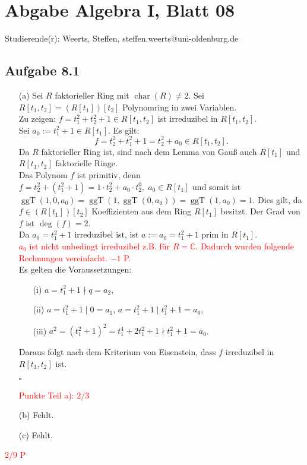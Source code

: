 \documentclass[12pt]{article}
\newcommand{\corr}[1]{\textcolor{red}{#1}}
\newcommand{\QED}{\begin{flushright} $\square$ \end{flushright}}
\newcommand{\Char}{\operatorname{char}}
\newcommand{\ggT}{\operatorname{ggT}}
\newcommand{\grad}{\operatorname{deg}}
\begin{document}
\section*{Abgabe Algebra I, Blatt 08}

Studierende(r): Weerts, Steffen, steffen.weerts@uni-oldenburg.de

\subsection*{Aufgabe 8.1}
\begin{enumerate}
	\item[(a)] Sei $R$ faktorieller Ring mit $\Char(R)\neq2$. Sei $R[t_1,t_2]=(R[t_1])[t_2]$ Polynomring in zwei Variablen. \\
	Zu zeigen: $f=t_1^2+t_2^2+1\in R[t_1,t_2]$ ist irreduzibel in $R[t_1,t_2]$. \\
	Sei $a_0:=t_1^2+1\in R[t_1]$. Es gilt: $$f=t_2^2+t_1^2+1=t_2^2+a_0\in R[t_1,t_2].$$
	Da $R$ faktorieller Ring ist, sind nach dem Lemma von Gauß auch $R[t_1]$ und $R[t_1,t_2]$ faktorielle Ringe. \\
	Das Polynom $f$ ist primitiv, denn $f=t_2^2+(t_1^2+1)=1\cdot t_2^2+a_0\cdot t_2^0,\; a_0\in R[t_1]$ und somit ist $\ggT(1,0,a_0)=\ggT(1,\ggT(0,a_0))=\ggT(1,a_0)=1$. Dies gilt, da $f\in (R[t_1])[t_2]$ Koeffizienten aus dem Ring $R[t_1]$ besitzt. Der Grad von $f$ ist $\grad(f)=2$. \\
	Da $a_0=t_1^2+1$ irreduzibel ist, ist $a:=a_0=t_1^2+1$ prim in $R[t_1]$. \\
\corr{$a_0$ ist nicht unbedingt irreduzibel z.B. für $R=\mathbb{C}$. Dadurch wurden folgende Rechnungen vereinfacht. $-1$ P.}\\
	Es gelten die Voraussetzungen:
	\begin{enumerate}
		\item[(i)] $a=t_1^2+1\nmid q=a_2$,
		\item[(ii)] $a=t_1^2+1\mid 0=a_1$, $a=t_1^2+1\mid t_1^2+1=a_0$,
		\item[(iii)] $a^2=(t_1^2+1)^2=t_1^4+2t_1^2+1\nmid t_1^2+1=a_0$.
	\end{enumerate}
	Daraus folgt nach dem Kriterium von Eisenstein, dass $f$ irreduzibel in $R[t_1,t_2]$ ist.
	\QED
\corr{Punkte Teil a): $2/3$}
	
	\item[(b)] Fehlt.
	
	\item[(c)] Fehlt.
\end{enumerate}
\corr{$2/9$ P}
\end{document}
